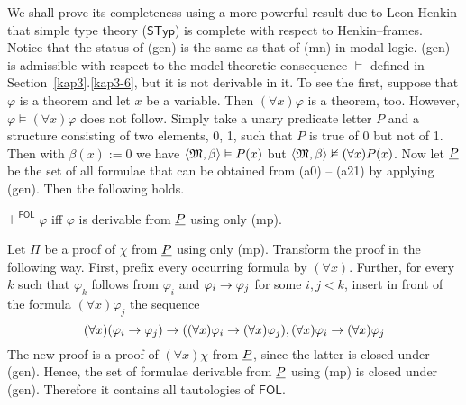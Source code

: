 We shall prove its completeness using a more powerful result due to Leon 
Henkin that simple type theory ($\mathsf{STyp}$) is complete with respect 
to Henkin--frames. Notice that the status of (gen) is the same as that 
of (mn) in modal logic. (gen) is admissible with respect to the model 
theoretic consequence $\vDash$ defined in Section~\ref{kap3}.\ref{kap3-6}, 
but it is
not derivable in it. To see the first, suppose that $\varphi$ is a
theorem and let $x$ be a variable. Then $(\forall x)\varphi$ is a
theorem, too. However, $\varphi \vDash (\forall x)\varphi$ does
not follow. Simply take a unary predicate letter $P$ and a
structure consisting of two elements, 0, 1, such that $P$ is true
of 0 but not of 1. Then with $\beta(x) := 0$ we have $\langle \mathfrak{M},
\beta\rangle \vDash P(x)$ but $\langle \mathfrak{M}, \beta\rangle \nvDash (\forall
x)P(x)$. Now let $\underline{P}$ be the set of all formulae that can be
obtained from (a0) -- (a21) by applying (gen). Then the following
holds.
\begin{thm}
\label{thm:genelim}
$\vdash^{\mathsf{FOL}} \varphi$ iff $\varphi$ is derivable from 
$\underline{P}$ using only (mp).
\end{thm}
\proofbeg
Let $\Pi$ be a proof of $\chi$ from $\underline{P}$ using only (mp). 
Transform the proof in the following way. First, prefix every 
occurring formula by $(\forall x)$. Further, for every $k$ such 
that $\varphi_k$ follows from $\varphi_i$ 
and $\varphi_i \rightarrow \varphi_j$ for some $i,j < k$, insert in front of 
the formula $(\forall x)\varphi_j$ the sequence
\begin{equation}
(\forall x)(\varphi_i \rightarrow \varphi_j) \rightarrow ((\forall x)\varphi_i \rightarrow 
	(\forall x)\varphi_j), 
(\forall x)\varphi_i \rightarrow (\forall x)\varphi_j 
\end{equation}
The new proof is a proof of $(\forall x)\chi$ from $\underline{P}$, 
since the latter is closed under (gen). Hence, the set of formulae 
derivable from $\underline{P}$ using (mp) is closed under (gen). Therefore 
it contains all tautologies of $\mathsf{FOL}$.
\proofend

